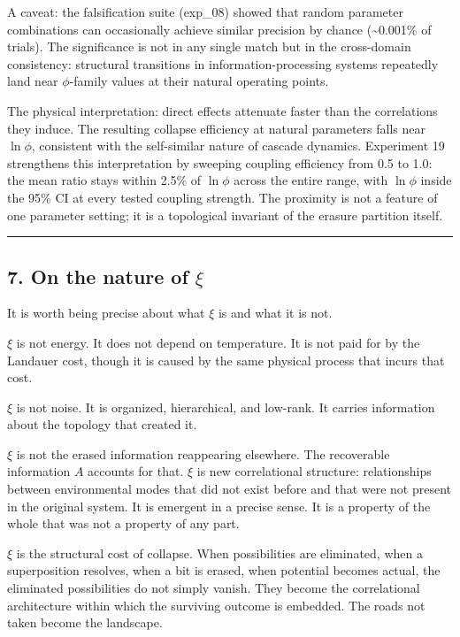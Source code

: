 \documentclass[
  11pt,
  a4paper]{article}
\begin{document}
A caveat: the falsification suite (exp\_08) showed that random parameter
combinations can occasionally achieve similar precision by chance
(\textasciitilde0.001\% of trials). The significance is not in any
single match but in the cross-domain consistency: structural transitions
in information-processing systems repeatedly land near \(\phi\)-family
values at their natural operating points.

The physical interpretation: direct effects attenuate faster than the
correlations they induce. The resulting collapse efficiency at natural
parameters falls near \(\ln\phi\), consistent with the self-similar
nature of cascade dynamics. Experiment 19 strengthens this
interpretation by sweeping coupling efficiency from 0.5 to 1.0: the mean
ratio stays within 2.5\% of \(\ln\phi\) across the entire range, with
\(\ln\phi\) inside the 95\% CI at every tested coupling strength. The
proximity is not a feature of one parameter setting; it is a topological
invariant of the erasure partition itself.

\begin{center}\rule{0.5\linewidth}{0.5pt}\end{center}

\subsection{\texorpdfstring{7. On the nature of
\(\xi\)}{7. On the nature of \textbackslash xi}}\label{on-the-nature-of-xi}

It is worth being precise about what \(\xi\) is and what it is not.

\(\xi\) is not energy. It does not depend on temperature. It is not paid
for by the Landauer cost, though it is caused by the same physical
process that incurs that cost.

\(\xi\) is not noise. It is organized, hierarchical, and low-rank. It
carries information about the topology that created it.

\(\xi\) is not the erased information reappearing elsewhere. The
recoverable information \(A\) accounts for that. \(\xi\) is new
correlational structure: relationships between environmental modes that
did not exist before and that were not present in the original system.
It is emergent in a precise sense. It is a property of the whole that
was not a property of any part.

\(\xi\) is the structural cost of collapse. When possibilities are
eliminated, when a superposition resolves, when a bit is erased, when
potential becomes actual, the eliminated possibilities do not simply
vanish. They become the correlational architecture within which the
surviving outcome is embedded. The roads not taken become the landscape.
\end{document}
